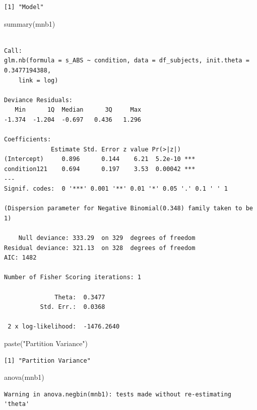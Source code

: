 \documentclass[
  letterpaper,
  DIV=11,
  numbers=noendperiod]{scrreprt}
\newenvironment{Shaded}{\begin{snugshade}}{\end{snugshade}}
\newcommand{\FunctionTok}[1]{\textcolor[rgb]{0.28,0.35,0.67}{#1}}
\newcommand{\NormalTok}[1]{\textcolor[rgb]{0.00,0.23,0.31}{#1}}
\newcommand{\StringTok}[1]{\textcolor[rgb]{0.13,0.47,0.30}{#1}}
\begin{document}
\begin{verbatim}
[1] "Model"
\end{verbatim}

\begin{Shaded}
\begin{Highlighting}[]
\FunctionTok{summary}\NormalTok{(mnb1)}
\end{Highlighting}
\end{Shaded}

\begin{verbatim}

Call:
glm.nb(formula = s_ABS ~ condition, data = df_subjects, init.theta = 0.3477194388, 
    link = log)

Deviance Residuals: 
   Min      1Q  Median      3Q     Max  
-1.374  -1.204  -0.697   0.436   1.296  

Coefficients:
             Estimate Std. Error z value Pr(>|z|)    
(Intercept)     0.896      0.144    6.21  5.2e-10 ***
condition121    0.694      0.197    3.53  0.00042 ***
---
Signif. codes:  0 '***' 0.001 '**' 0.01 '*' 0.05 '.' 0.1 ' ' 1

(Dispersion parameter for Negative Binomial(0.348) family taken to be 1)

    Null deviance: 333.29  on 329  degrees of freedom
Residual deviance: 321.13  on 328  degrees of freedom
AIC: 1482

Number of Fisher Scoring iterations: 1

              Theta:  0.3477 
          Std. Err.:  0.0368 

 2 x log-likelihood:  -1476.2640 
\end{verbatim}

\begin{Shaded}
\begin{Highlighting}[]
\FunctionTok{paste}\NormalTok{(}\StringTok{"Partition Variance"}\NormalTok{)}
\end{Highlighting}
\end{Shaded}

\begin{verbatim}
[1] "Partition Variance"
\end{verbatim}

\begin{Shaded}
\begin{Highlighting}[]
\FunctionTok{anova}\NormalTok{(mnb1)}
\end{Highlighting}
\end{Shaded}

\begin{verbatim}
Warning in anova.negbin(mnb1): tests made without re-estimating 'theta'
\end{verbatim}
\end{document}
